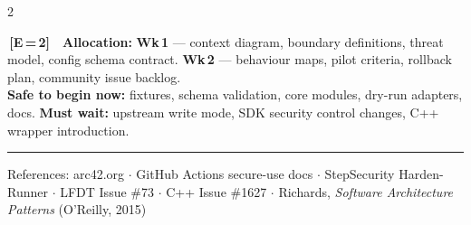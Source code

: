 \documentclass[9pt, a4paper]{article}
\newcommand{\ic}[2]{%
  {\colorbox{tag#1}{\color{white}\bfseries\fontsize{5.5}{6.5}\selectfont\,[#1\,=\,#2]\,}}%
}
\begin{document}
\begin{multicols}{2}
\begin{invariantbox}
\fontsize{7.5}{9}\selectfont
\ic{E}{2}\ \textbf{Allocation:}
\textbf{Wk\,1} — context diagram, boundary definitions, threat model, config schema contract.
\textbf{Wk\,2} — behaviour maps, pilot criteria, rollback plan, community issue backlog.\\
\textbf{Safe to begin now:} fixtures, schema validation, core modules, dry-run adapters, docs.
\textbf{Must wait:} upstream write mode, SDK security control changes, C++ wrapper introduction.
\end{invariantbox}

\end{multicols}

\vspace{2pt}
{\color{hieroRule}\hrule}
\vspace{2pt}
{\fontsize{6.8}{8}\selectfont\color{hieroGray}\centering
  References: arc42.org $\cdot$ GitHub Actions secure-use docs $\cdot$ StepSecurity Harden-Runner
  $\cdot$ LFDT Issue \#73 $\cdot$ C++ Issue \#1627 $\cdot$ Richards, \textit{Software Architecture Patterns}
  (O'Reilly, 2015)\par}

\end{document}

